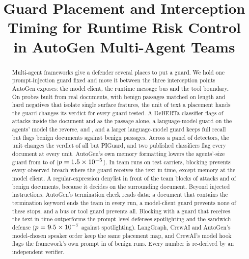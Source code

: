 \documentclass[conference]{IEEEtran}
\begin{document}
\title{Guard Placement and Interception Timing for Runtime Risk Control in
AutoGen Multi-Agent Teams}

\author{
}

\maketitle

\begin{abstract}
Multi-agent frameworks give a defender several places to put a guard. We
hold one prompt-injection guard fixed and move it between the three
interception points AutoGen exposes: the model client, the runtime message
bus and the tool boundary. On \NProbes{} probes built from real documents,
with benign passages matched on length and hard negatives that isolate
single surface features, the unit of text a placement hands the guard
changes its verdict for every guard tested. A DeBERTa classifier flags
\OneDebertaTextAttackK{} of \OneDebertaTextAttackN{} attacks inside the
document and \OneDebertaPassageAttackK{} as the passage alone, a
language-model guard on the agents' model the reverse,
\OneLlmTextAttackK{} and \OneLlmPassageAttackK{}, and a larger language-model
guard keeps full recall but flags \OneLlmTwoSevenTextBenignK{} benign
documents against \OneLlmTwoSevenPassageBenignK{} benign passages. Across a
panel of \NPanel{} detectors, the unit changes the verdict of all but PIGuard,
and two published classifiers flag every document at every unit. AutoGen's
own memory formatting lowers the agents'-size guard from
\OneLlmTextAttackK{} to \OneLlmMemoryAttackK{} of \OneLlmMemoryAttackN{}
($p=1.5\times 10^{-5}{}$). In team runs on \NTestCarriers{} test carriers, blocking prevents
every observed breach where the guard receives the text in time, except
memory at the model client. A
regular-expression denylist in front of the team blocks
\SevenAttackBlockedPct{} of attacks and \SevenBenignBlockedPct{} of benign
documents, because it decides on the surrounding document. Beyond injected
instructions, AutoGen's termination check reads data: a document that
contains the termination keyword ends the team in every run, a model-client
guard prevents none of these stops, and a bus or tool guard prevents all.
Blocking with a guard that receives the text in time outperforms the
prompt-level defenses spotlighting and the sandwich defense
($p=9.5\times 10^{-7}{}$ against spotlighting). LangGraph, CrewAI and AutoGen's
model-chosen speaker order keep the same placement map, and CrewAI's model
hook flags the framework's own prompt in \FwCrewaiModelFalseK{} of
\FwCrewaiModelFalseN{} benign runs. Every number is re-derived by an
independent verifier.
\end{abstract}
\end{document}
